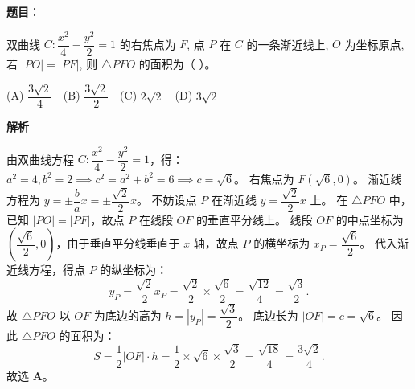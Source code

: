 \begin{answer}

\textbf{题目}：

双曲线 $C: \dfrac{x^2}{4} - \dfrac{y^2}{2} = 1$ 的右焦点为 $F$, 点 $P$ 在 $C$ 的一条渐近线上, $O$ 为坐标原点, 若 $|PO| = |PF|$, 则 $\triangle PFO$ 的面积为（ ）。

(A) $\dfrac{3\sqrt{2}}{4}$　(B) $\dfrac{3\sqrt{2}}{2}$　(C) $2\sqrt{2}$　(D) $3\sqrt{2}$

\textbf{解析}

由双曲线方程 $C: \dfrac{x^2}{4} - \dfrac{y^2}{2} = 1$，得：
$a^2 = 4, b^2 = 2 \implies c^2 = a^2 + b^2 = 6 \implies c = \sqrt{6}$。
右焦点为 $F(\sqrt{6}, 0)$。
渐近线方程为 $y = \pm \dfrac{b}{a} x = \pm \dfrac{\sqrt{2}}{2} x$。
不妨设点 $P$ 在渐近线 $y = \dfrac{\sqrt{2}}{2} x$ 上。
在 $\triangle PFO$ 中，已知 $|PO| = |PF|$，故点 $P$ 在线段 $OF$ 的垂直平分线上。
线段 $OF$ 的中点坐标为 $\left(\dfrac{\sqrt{6}}{2}, 0\right)$，由于垂直平分线垂直于 $x$ 轴，故点 $P$ 的横坐标为 $x_P = \dfrac{\sqrt{6}}{2}$。
代入渐近线方程，得点 $P$ 的纵坐标为：
\nopagebreak[4]
\[y_P = \frac{\sqrt{2}}{2} x_P = \frac{\sqrt{2}}{2} \times \frac{\sqrt{6}}{2} = \frac{\sqrt{12}}{4} = \frac{\sqrt{3}}{2}.\]
故 $\triangle PFO$ 以 $OF$ 为底边的高为 $h = |y_P| = \dfrac{\sqrt{3}}{2}$。
底边长为 $|OF| = c = \sqrt{6}$。
因此 $\triangle PFO$ 的面积为：
\nopagebreak[4]
\[S = \frac{1}{2} |OF| \cdot h = \frac{1}{2} \times \sqrt{6} \times \frac{\sqrt{3}}{2} = \frac{\sqrt{18}}{4} = \frac{3\sqrt{2}}{4}.\]
故选 \textbf{A}。


\end{answer}

